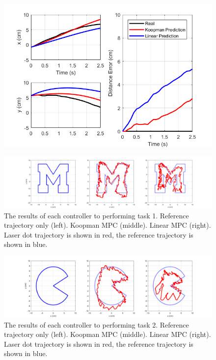 \begin{figure}
    \centering
    \includegraphics[width=\linewidth]{figures/predictionComparison_ph.png}
    \caption{}
    \label{fig:compare_blockM}
\end{figure}

\begin{figure}
    \centering
    \includegraphics[width=\linewidth]{figures/compare_blockM_300s_draft.png}
    \caption{The results of each controller to performing task 1. Reference trajectory only (left). Koopman MPC (middle). Linear MPC (right). Laser dot trajectory is shown in red, the reference trajectory is shown in blue.}
    \label{fig:compare_blockM}
\end{figure}

\begin{figure}
    \centering
    \includegraphics[width=\linewidth]{figures/compare_pacman68_90s_draft.png}
    \caption{The results of each controller to performing task 2. Reference trajectory only (left). Koopman MPC (middle). Linear MPC (right). Laser dot trajectory is shown in red, the reference trajectory is shown in blue.}
    \label{fig:compare_pacman}
\end{figure}

